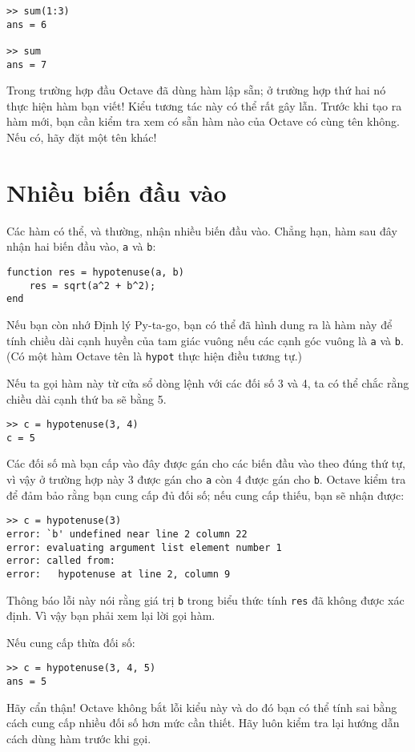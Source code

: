 \documentclass[12pt]{book}
\begin{document}
\begin{verbatim}
>> sum(1:3)
ans = 6

>> sum
ans = 7
\end{verbatim}
%
Trong trường hợp đầu Octave đã dùng hàm lập sẵn; ở trường hợp 
thứ hai nó thực hiện hàm bạn viết! Kiểu tương tác này có thể 
rất gây lẫn. Trước khi tạo ra hàm mới, bạn cần kiểm tra xem
có sẵn hàm nào của Octave có cùng tên không. Nếu có, hãy đặt
một tên khác!


\section{Nhiều biến đầu vào}
\label{hypotenuse}

Các hàm có thể, và thường, nhận nhiều biến đầu vào. Chẳng hạn,
hàm sau đây nhận hai biến đầu vào, {\tt a} và {\tt b}:

\begin{verbatim}
function res = hypotenuse(a, b)
    res = sqrt(a^2 + b^2);
end
\end{verbatim}
%
Nếu bạn còn nhớ Định lý Py-ta-go, bạn có thể đã hình dung ra là
hàm này để tính chiều dài cạnh huyền của tam giác vuông nếu các
cạnh góc vuông là {\tt a} và {\tt b}.  (Có một hàm Octave tên là 
{\tt hypot} thực hiện điều tương tự.)

Nếu ta gọi hàm này từ cửa sổ dòng lệnh với các đối số 3 và 4, ta có thể
chắc rằng chiều dài cạnh thứ ba sẽ bằng 5.

\begin{verbatim}
>> c = hypotenuse(3, 4)
c = 5
\end{verbatim}
Các đối số mà bạn cấp vào đây được gán cho các biến đầu vào theo
đúng thứ tự, vì vậy ở trường hợp này 3 được gán cho {\tt a} còn 4 
được gán cho {\tt b}.  Octave kiểm tra để đảm bảo rằng bạn cung
cấp đủ đối số; nếu cung cấp thiếu, bạn sẽ nhận được:

\begin{verbatim}
>> c = hypotenuse(3)
error: `b' undefined near line 2 column 22
error: evaluating argument list element number 1
error: called from:
error:   hypotenuse at line 2, column 9
\end{verbatim}
%
Thông báo lỗi này nói rằng giá trị \texttt{b} trong biểu thức tính 
\texttt{res} đã không được xác định. Vì vậy bạn phải xem lại 
lời gọi hàm. 

Nếu cung cấp thừa đối số:

\begin{verbatim}
>> c = hypotenuse(3, 4, 5)
ans = 5
\end{verbatim}
%
Hãy cẩn thận! Octave không bắt lỗi kiểu này và do đó bạn có thể tính sai
bằng cách cung cấp nhiều đối số hơn mức cần thiết. Hãy luôn kiểm tra lại
hướng dẫn cách dùng hàm trước khi gọi.
\end{document}
